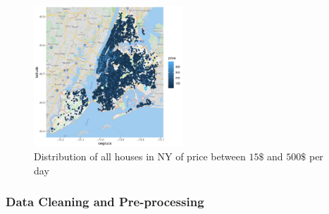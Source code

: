 \documentclass{FR16}
\begin{document}
\begin{figure}[H]
\centering
\includegraphics[width=0.5\textwidth]{figures/figure3.pdf} 
\caption{\label{fig:3} Distribution of all houses in NY of price between $15\$$ and $500\$$ per day}
\end{figure}
\subsubsection{Data Cleaning and Pre-processing}
\end{document}
